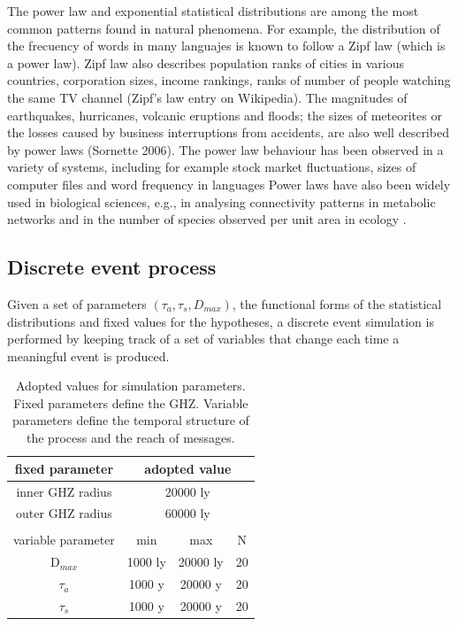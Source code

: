 \documentclass[crop]{CSLB}%
\begin{document}
The power law and exponential statistical distributions are among the
most common patterns found in natural phenomena.
%
For example, the distribution of the frecuency of words in many
languajes is known to follow a Zipf law (which is a power law).
%
Zipf law also describes population ranks of cities in various
countries, corporation sizes, income rankings, ranks of number of
people watching the same TV channel (Zipf's law entry on Wikipedia).
%
The magnitudes of earthquakes, hurricanes, volcanic eruptions and
floods; the sizes of meteorites or the losses caused by business
interruptions from accidents, are also well described by power laws
(Sornette 2006).
%
The power law behaviour has been observed in a variety of systems,
including for example stock market fluctuations, sizes of computer
files and word frequency in languages \citep{mitzenmacher_brief_2004,
Newman_power_2005, simkin_theory_2006}
%
Power laws have also been widely used in biological sciences, e.g., in
analysing connectivity patterns in metabolic networks
\citep{jeong_large_2000} and in the number of species observed per
unit area in ecology \citep{garcia_origin_2006, frank_common_2009}.


\subsection{Discrete event process}

Given a set of parameters $(\tau_a, \tau_s, D_{max})$, the functional
forms of the statistical distributions and fixed values
for the hypotheses, a discrete
event simulation is performed by keeping track of a set of variables
that change each time a meaningful event is produced.



\setlength{\tabcolsep}{10pt}
\begin{table}
\centering
\begin{tabular}{cccc}
\hline
   fixed parameter & \multicolumn{3}{c}{adopted value}\hfill \\
\hline
   inner GHZ radius\hfill & \multicolumn{3}{c}{20000 ly}\\
   outer GHZ radius & \multicolumn{3}{c}{60000 ly}\\ \\
\hline
   variable parameter & min & max & N \\
\hline
   D$_{max}$ & 1000 ly & 20000 ly & 20\\
   $\tau_{a}$ & 1000 y & 20000 y & 20\\
   $\tau_{s}$ & 1000 y & 20000 y & 20\\
\hline
\end{tabular}
\caption{Adopted values for simulation parameters. Fixed parameters
   define the GHZ.  Variable parameters define the temporal structure
   of the process and the reach of messages.}
\label{T_parameters}
\end{table}
\end{document}
